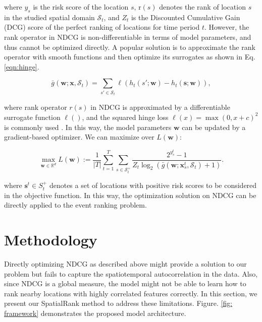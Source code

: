 \documentclass{article}
\def \S {\mathbf{S}}
\def \R {\mathbb{R}}
\def \w {\mathbf{w}}
\def \x {\mathbf{x}}
\def \x {\mathbf{x}}
\def \s {\mathbf{s}}
\def \x {\mathbf{x}}
\def \w {\mathbf{w}}
\def \R {\mathbb{R}}
\def \S {\mathcal{S}}
\def \s {\mathbf{s}}
\begin{document}
where $y_s$ is the risk score of the location $s$, $\text{r}(s)$ denotes the rank of location $s$ in the studied spatial domain $\S_t$, and $Z_t$ is the Discounted Cumulative Gain (DCG) score \cite{jarvelin2002cumulated} of the perfect ranking of locations for time period $t$. However, the rank operator in NDCG is non-differentiable in terms of model parameters, and thus cannot be optimized directly. A popular solution is to approximate the rank operator with smooth functions and then optimize its surrogates \cite{SoftRank}\cite{ApproxNDCG}\cite{Qiu2022LargescaleSO} as shown in Eq. \ref{eqn:hinge}.

\begin{equation} \label{eqn:hinge}
    \bar g(\w; \x, \S_t) = \sum_{s'\in\S_t}\ell(h_t(s'; \w) - h_t(\s; \w)),
\end{equation}

where rank operator $r(s)$ in NDCG is approximated by a differentiable surrogate function $\ell()$, and the squared hinge loss $\ell(x)= \max(0,x+c)^2$ is commonly used \cite{WuMingrui2009SDfl}. In this way, the model parameters $\w$ can be updated by a gradient-based optimizer. 
We can maximize over $L(\w)$:

\begin{equation} \label{eqn:NDCG}
\max_{\w\in\R^d} L(\w):=\frac{1}{|T|}\sum_{t=1}^T\sum_{s\in \S^+_t} \frac{2^{y^t_s}-1}{Z_t\log_2(\bar g(\w; \x^t_s, \S_t)+1)}.
\end{equation}

where %
$\s^t\in S^+_t$ denotes a set of locations with positive risk scores to be considered in the objective function. In this way, the optimization solution on NDCG can be directly applied to the event ranking problem.

\section{Methodology}

Directly optimizing NDCG as described above might provide a solution to our problem but fails to capture the spatiotemporal autocorrelation in the data. Also, since NDCG is a global measure, the model might not be able to learn how to rank nearby locations with highly correlated features correctly. In this section, we present our SpatialRank method to address these limitations. Figure. \ref{fig: framework} demonstrates the proposed model architecture.
\end{document}
